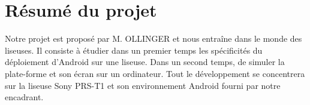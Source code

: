 \chapter{Résumé du projet}

Notre projet est proposé par M. OLLINGER et nous entraîne dans le monde des liseuses. Il consiste à étudier dans un premier temps les spécificités du déploiement d'Android sur une liseuse. Dans un second temps, de simuler la plate-forme et son écran sur un ordinateur. Tout le développement se concentrera sur la liseuse Sony PRS-T1 et son environnement Android fourni par notre encadrant. 

